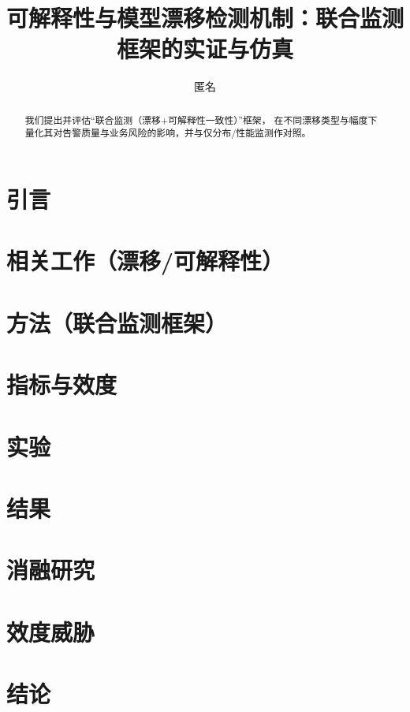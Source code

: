 \documentclass[UTF8]{ctexart}
\title{可解释性与模型漂移检测机制：联合监测框架的实证与仿真}
\author{匿名}
\date{}
\begin{document}
\maketitle

\begin{abstract}
我们提出并评估“联合监测（漂移+可解释性一致性）”框架，
在不同漂移类型与幅度下量化其对告警质量与业务风险的影响，并与仅分布/性能监测作对照。
\end{abstract}

\section{引言}
\section{相关工作（漂移/可解释性）}
\section{方法（联合监测框架）}
\section{指标与效度}
\section{实验}
\section{结果}
\section{消融研究}
\section{效度威胁}
\section{结论}



\end{document}
